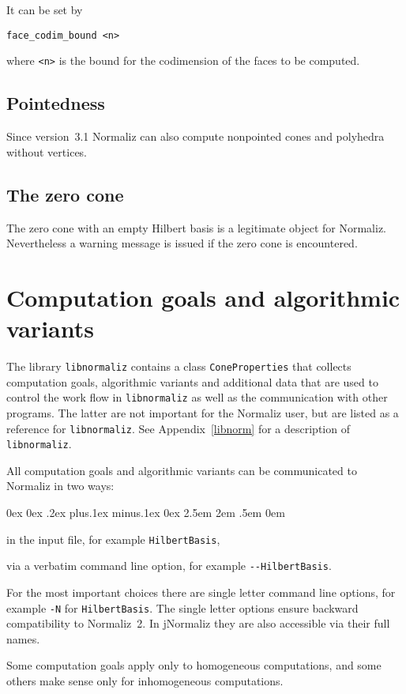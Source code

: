 \documentclass[12pt,a4paper]{scrartcl}
\newcounter{listi}
\newcommand{\stdli}{ \topsep0ex \partopsep0ex %
\parsep.2ex plus.1ex minus.1ex \itemsep0ex%
\leftmargin2.5em \labelwidth2em \labelsep.5em \rightmargin0em}%
\newenvironment{arab}{\begin{list}{\textup{(\arabic{listi})}}%
	{\usecounter{listi}\stdli}}{\end{list}}
\theoremstyle{definition}
\begin{document}
It can be set by
\begin{Verbatim}
face_codim_bound <n>
\end{Verbatim}
where \verb|<n>| is the bound for the codimension of the faces to be computed.


\subsection{Pointedness}

Since version~3.1 Normaliz can also compute nonpointed cones and polyhedra without vertices.

\subsection{The zero cone}\label{zero}
The zero cone with an empty Hilbert basis is a legitimate
object for Normaliz. Nevertheless a warning message is issued
if the zero cone is encountered.

\section{Computation goals and algorithmic variants}\label{Goals}

The library \verb|libnormaliz| contains a class \verb|ConeProperties| that collects computation goals, algorithmic variants and additional data that are used to control the work flow in \verb|libnormaliz| as well as the communication with other programs. The latter are not important for the Normaliz user, but are listed as a reference for \verb|libnormaliz|. See Appendix~\ref{libnorm} for a description of \verb|libnormaliz|.

All computation goals and algorithmic variants can be communicated to Normaliz in two ways:
\begin{arab}
	\item in the input file, for example \verb|HilbertBasis|,
	\item via a verbatim command line option, for example \verb|--HilbertBasis|.
\end{arab}
For the most important choices there are single letter command line options, for example \verb|-N| for \verb|HilbertBasis|. The single letter options ensure backward compatibility to Normaliz~2. In jNormaliz they are also accessible via their full names.

Some computation goals apply only to homogeneous computations, and some others make sense only for inhomogeneous computations.
\end{document}
